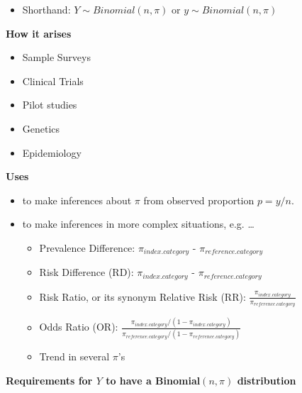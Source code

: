 \documentclass[]{book}
\providecommand{\tightlist}{%
  \setlength{\itemsep}{0pt}\setlength{\parskip}{0pt}}
\begin{document}
\begin{itemize}
\tightlist
\item
  Shorthand: \(Y \sim Binomial(n, \pi)\) or \(y \sim Binomial(n, \pi)\)
\end{itemize}

\textbf{How it arises}

\begin{itemize}
\tightlist
\item
  Sample Surveys
\item
  Clinical Trials
\item
  Pilot studies
\item
  Genetics
\item
  Epidemiology
\end{itemize}

\textbf{Uses}

\begin{itemize}
\item
  to make inferences about \(\pi\) from observed proportion \(p = y/n\).
\item
  to make inferences in more complex situations, e.g. \ldots{}

  \begin{itemize}
  \item
    Prevalence Difference: \(\pi_{index.category}\) - \(\pi_{reference.category}\)
  \item
    Risk Difference (RD): \(\pi_{index.category}\) - \(\pi_{reference.category}\)
  \item
    Risk Ratio, or its synonym Relative Risk (RR): \(\frac{\pi_{index.category}}{\pi_{reference.category}}\)
  \item
    Odds Ratio (OR): \(\frac{\pi_{index.category}/(1-\pi_{index.category})}{  \pi_{reference.category}/(1-\pi_{reference.category}) }\)
  \item
    Trend in several \(\pi\)'s
  \end{itemize}
\end{itemize}

\textbf{Requirements for \(Y\) to have a Binomial\((n, \pi)\) distribution}
\end{document}
